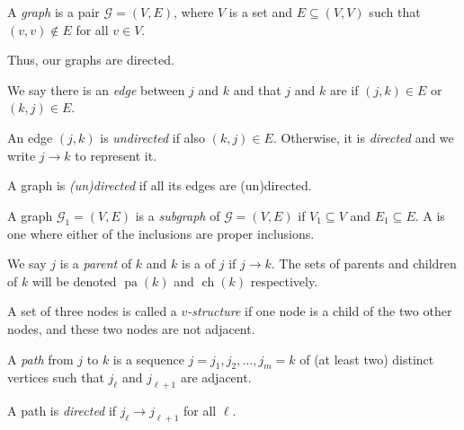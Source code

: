 \documentclass[a4paper]{article}
\DeclareMathOperator\pa{pa}
\DeclareMathOperator\child{ch}
\begin{document}
\begin{defi}[Graph]
  A \emph{graph} is a pair $\mathcal{G} = (V, E)$, where $V$ is a set and $E \subseteq (V, V)$ such that $(v, v) \not \in E$ for all $v \in V$. %
\end{defi}
Thus, our graphs are directed.

\begin{defi}[Edge]
  We say there is an \emph{edge} between $j$ and $k$ and that $j$ and $k$ are  if $(j, k) \in E$ or $(k, j) \in E$.
\end{defi}

\begin{defi}
  An edge $(j, k)$ is \emph{undirected} if also $(k, j) \in E$. Otherwise, it is \emph{directed} and we write $j \to k$ to represent it.
\end{defi}

\begin{defi}
  A graph is \emph{(un)directed} if all its edges are (un)directed.
\end{defi}

\begin{defi}[Subgraph]
  A graph $\mathcal{G}_1 = (V, E)$ is a \emph{subgraph} of $\mathcal{G} = (V, E)$ if $V_1 \subseteq V$ and $E_1 \subseteq E$. A  is one where either of the inclusions are proper inclusions.
\end{defi}

\begin{defi}
  We say $j$ is a \emph{parent} of $k$ and $k$ is a  of $j$ if $j \to k$. The sets of parents and children of $k$ will be denoted $\pa(k)$ and $\child(k)$ respectively. %
\end{defi}

\begin{defi}[$v$-structure]
  A set of three nodes is called a \emph{$v$-structure} if one node is a child of the two other nodes, and these two nodes are not adjacent.
\end{defi}


\begin{defi}[Path]
  A \emph{path} from $j$ to $k$ is a sequence $j = j_1, j_2, \ldots, j_m = k$ of (at least two) distinct vertices such that $j_\ell$ and $j_{\ell + 1}$ are adjacent.

  A path is \emph{directed} if $j_\ell \to j_{\ell + 1}$ for all $\ell$.
\end{defi}
\end{document}
